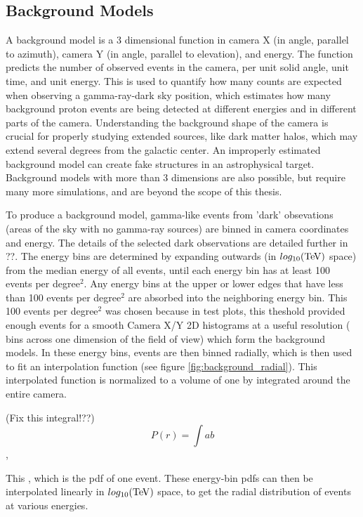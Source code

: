   \subsection{Background Models}\label{background_production}
    A background model is a 3 dimensional function in camera X (in angle, parallel to azimuth), camera Y (in angle, parallel to elevation), and energy.
    The function predicts the number of observed events in the camera, per unit solid angle, unit time, and unit energy.
    This is used to quantify how many counts are expected when observing a gamma-ray-dark sky position, which estimates how many background proton events are being detected at different energies and in different parts of the camera.
    Understanding the background shape of the camera is crucial for properly studying extended sources, like dark matter halos, which may extend several degrees from the galactic center.
    An improperly estimated background model can create fake structures in an astrophysical target.
    Background models with more than 3 dimensions are also possible, but require many more simulations, and are beyond the scope of this thesis.

    To produce a background model, gamma-like events from 'dark' obsevations (areas of the sky with no gamma-ray sources) are binned in camera coordinates and energy.
    The details of the selected dark observations are detailed further in ??.
    The energy bins are determined by expanding outwards (in $log_{10}(\TeV )$ space) from the median energy of all events, until each energy bin has at least 100 events per degree$^2$.
    Any energy bins at the upper or lower edges that have less than 100 events per degree$^2$ are absorbed into the neighboring energy bin.
    This 100 events per degree$^2$ was chosen because in test plots, this theshold provided enough events for a smooth Camera X/Y 2D histograms at a useful resolution ( bins across one dimension of the field of view) which form the background models.
    In these energy bins, events are then binned radially, which is then used to fit an interpolation function (see figure \ref{fig:background_radial}).
    This interpolated function is normalized to a volume of one by integrated around the entire camera.

    (Fix this integral!??)
    \begin{equation}
      \label{eqn:background_integral}
      P(r) = \int{a}{b}
    \end{equation},

    This , which is the pdf of one event.
    These energy-bin pdfs can then be interpolated linearly in $log_{10}(\TeV )$ space, to get the radial distribution of events at various energies.

